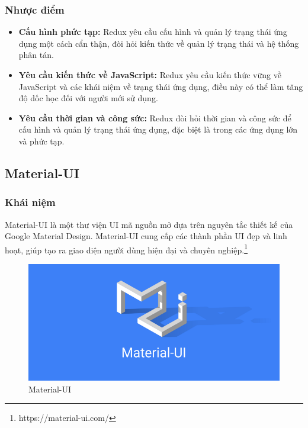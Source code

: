 \subsubsection{Nhược điểm}
\begin{itemize}
  \item \textbf{Cấu hình phức tạp:} Redux yêu cầu cấu hình và quản lý trạng thái ứng dụng một cách cẩn thận, đòi hỏi kiến thức về quản lý trạng thái và hệ thống phân tán.
  \item \textbf{Yêu cầu kiến thức về JavaScript:} Redux yêu cầu kiến thức vững về JavaScript và các khái niệm về trạng thái ứng dụng, điều này có thể làm tăng độ dốc học đối với người mới sử dụng.
  \item \textbf{Yêu cầu thời gian và công sức:} Redux đòi hỏi thời gian và công sức để cấu hình và quản lý trạng thái ứng dụng, đặc biệt là trong các ứng dụng lớn và phức tạp.
\end{itemize}
\subsection{Material-UI}
\subsubsection{Khái niệm}
\noindent Material-UI là một thư viện UI mã nguồn mở dựa trên nguyên tắc thiết kế của Google Material Design. Material-UI cung cấp các thành phần UI đẹp và linh hoạt, giúp tạo ra giao diện người dùng hiện đại và chuyên nghiệp.\footnote{https://material-ui.com/}
\begin{figure}[H]
  \begin{center}
    \includegraphics[scale=0.3]{images/hieu/phuluc/material-ui.png}
    \caption{Material-UI}
  \end{center}
\end{figure}
